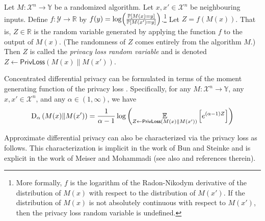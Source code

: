\documentclass{jpc}
\newcommand{\ex}[2]{{\ifx&#1& \mathbb{E} \else
\underset{#1}{\mathbb{E}} \fi \left[#2\right]}}
\newcommand{\pr}[2]{{\ifx&#1& \mathbb{P} \else
\underset{#1}{\mathbb{P}} \fi \left[#2\right]}}
\newcommand{\dr}[3]{\mathrm{D}_{#1}\left(#2\middle\|#3\right)}
\newcommand{\privloss}[2]{\mathsf{PrivLoss}\left(#1\middle\|#2\right)}
\newcommand{\R}{\mathbb{R}}
\begin{document}
\begin{defi}\label{defn:privloss}
Let $M\colon \mathcal{X}^n \to \mathbb{Y}$ be a randomized algorithm. Let $x,x'\in\mathcal{X}^n$ be neighbouring inputs. Define $f\colon \mathcal{Y} \to \R$ by $f(y) = \log\!\left(\frac{\pr{}{M(x)=y}}{\pr{}{M(x')=y}}\right)$.\footnote{More formally, $f$ is the logarithm of the Radon-Nikodym derivative of the distribution of $M(x)$ with respect to the distribution of $M(x')$. If the distribution of $M(x)$ is not absolutely continuous with respect to $M(x')$, then the privacy loss random variable is undefined.} Let $Z=f(M(x))$. That is, $Z \in \R$ is the random variable generated by applying the function $f$ to the output of $M(x)$. (The randomness of $Z$ comes entirely from the algorithm $M$.)
Then $Z$ is called the \emph{privacy loss random variable} and is denoted $Z\gets\privloss{M(x)}{M(x')}$.
\end{defi}

Concentrated differential privacy can be formulated in terms of the moment generating function of the privacy loss \citep{BunS16}. Specifically, for any $M\colon \mathcal{X}^n \to \mathbb{Y}$, any $x,x' \in \mathcal{X}^n$, and any $\alpha \in (1,\infty)$, we have \begin{equation}
    \dr{\alpha}{M(x)}{M(x')} = \frac{1}{\alpha-1} \log \left( \ex{Z \gets \privloss{M(x)}{M(x')}}{e^{(\alpha-1)Z}} \right)
\end{equation}

Approximate differential privacy can also be characterized via the privacy loss as follows. This characterization is implicit in the work of Bun and Steinke \cite[Lemma B.2]{BunS16} and is explicit in the work of Meiser and Mohammadi \cite[Lemma 1]{MeiserM18} (see also \cite[Observation 2]{GoogleComposition} and references therein).
\end{document}
